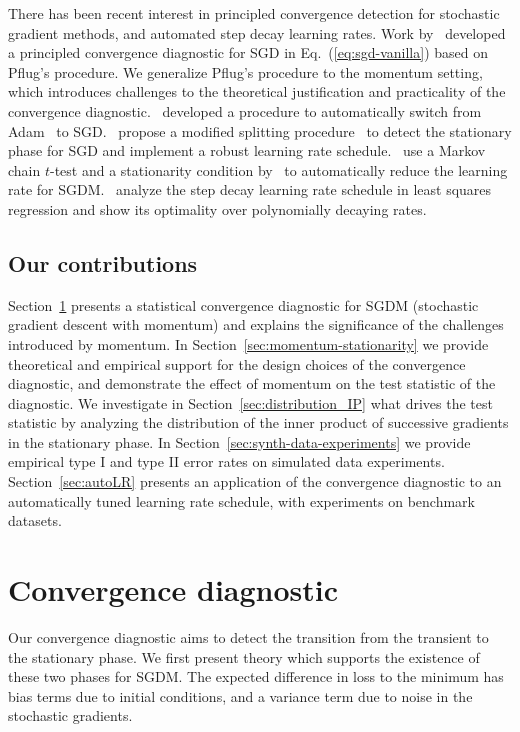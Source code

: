 \documentclass[conference]{IEEEtran}
\begin{document}
There has been recent interest in principled convergence detection for stochastic gradient methods, and automated step decay learning rates.
Work by~\cite{Proc:Chee_AISTATS18} developed a principled convergence diagnostic for  SGD in Eq.~(\ref{eq:sgd-vanilla}) based on Pflug's procedure. We generalize Pflug's procedure to the momentum setting, which introduces challenges to the theoretical justification and practicality of the convergence diagnostic.~\cite{Report:Shirish_arXiv17} developed a procedure to automatically switch from Adam~\cite{Proc:Kingma_ICLR15} to SGD.~\cite{matteo2019JSM} propose a modified splitting procedure~\cite{Report:Su_arXiv18} to detect the stationary phase for SGD and implement a robust learning rate schedule.~\cite{Proc:Lang_NeurIPS19} use a Markov chain $t$-test and a stationarity condition by~\cite{Proc:Yaida_ICLR19} to automatically reduce the learning rate for SGDM.~\cite{Proc:Ge_NeurIPS19} analyze the step decay learning rate schedule in least squares regression and show its optimality over polynomially decaying rates.


\subsection{Our contributions}

Section~\ref{sec:sgd-vanilla} presents a statistical convergence diagnostic for SGDM (stochastic gradient descent with momentum) and explains the significance of the challenges introduced by momentum. In Section~\ref{sec:momentum-stationarity} we provide theoretical and empirical support for the design choices of the convergence diagnostic, and demonstrate the effect of momentum on the test statistic of the diagnostic.
We investigate in Section~\ref{sec:distribution_IP} 
 what drives the test statistic by analyzing the distribution of the inner product of successive gradients in the stationary phase. In Section~\ref{sec:synth-data-experiments} we provide empirical type I and type II error rates on simulated data experiments. Section~\ref{sec:autoLR} presents an application of the convergence diagnostic to an automatically tuned learning rate schedule, with experiments on benchmark datasets.

\section{Convergence diagnostic}\label{sec:sgd-vanilla}

Our convergence diagnostic aims to detect the transition from the transient to the stationary phase. We first present theory which supports the existence of these two phases for SGDM.
The expected difference in loss to the minimum has bias terms due to initial conditions, and a variance term due to noise in the stochastic gradients.
\end{document}
